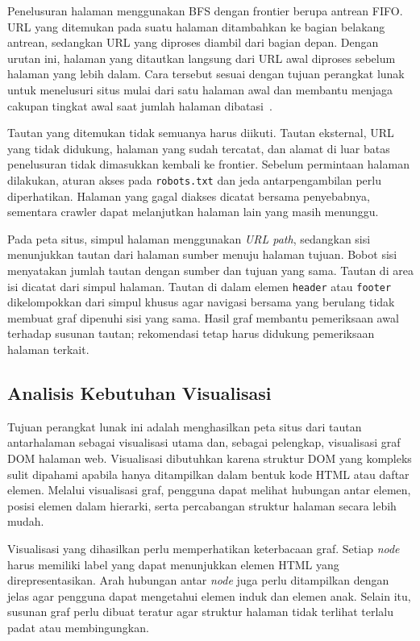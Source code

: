 Penelusuran halaman menggunakan BFS dengan frontier berupa antrean FIFO. URL yang ditemukan pada suatu halaman ditambahkan ke bagian belakang antrean, sedangkan URL yang diproses diambil dari bagian depan. Dengan urutan ini, halaman yang ditautkan langsung dari URL awal diproses sebelum halaman yang lebih dalam. Cara tersebut sesuai dengan tujuan perangkat lunak untuk menelusuri situs mulai dari satu halaman awal dan membantu menjaga cakupan tingkat awal saat jumlah halaman dibatasi~\cite{cormen:22:introalgo}.

Tautan yang ditemukan tidak semuanya harus diikuti. Tautan eksternal, URL yang tidak didukung, halaman yang sudah tercatat, dan alamat di luar batas penelusuran tidak dimasukkan kembali ke frontier. Sebelum permintaan halaman dilakukan, aturan akses pada \texttt{robots.txt} dan jeda antarpengambilan perlu diperhatikan. Halaman yang gagal diakses dicatat bersama penyebabnya, sementara crawler dapat melanjutkan halaman lain yang masih menunggu.

Pada peta situs, simpul halaman menggunakan \textit{URL path}, sedangkan sisi menunjukkan tautan dari halaman sumber menuju halaman tujuan. Bobot sisi menyatakan jumlah tautan dengan sumber dan tujuan yang sama. Tautan di area isi dicatat dari simpul halaman. Tautan di dalam elemen \texttt{header} atau \texttt{footer} dikelompokkan dari simpul khusus agar navigasi bersama yang berulang tidak membuat graf dipenuhi sisi yang sama. Hasil graf membantu pemeriksaan awal terhadap susunan tautan; rekomendasi tetap harus didukung pemeriksaan halaman terkait.

\subsection{Analisis Kebutuhan Visualisasi}
Tujuan perangkat lunak ini adalah menghasilkan peta situs dari tautan antarhalaman sebagai visualisasi utama dan, sebagai pelengkap, visualisasi graf DOM halaman web. Visualisasi dibutuhkan karena struktur DOM yang kompleks sulit dipahami apabila hanya ditampilkan dalam bentuk kode HTML atau daftar elemen. Melalui visualisasi graf, pengguna dapat melihat hubungan antar elemen, posisi elemen dalam hierarki, serta percabangan struktur halaman secara lebih mudah.

Visualisasi yang dihasilkan perlu memperhatikan keterbacaan graf. Setiap \textit{node} harus memiliki label yang dapat menunjukkan elemen HTML yang direpresentasikan. Arah hubungan antar \textit{node} juga perlu ditampilkan dengan jelas agar pengguna dapat mengetahui elemen induk dan elemen anak. Selain itu, susunan graf perlu dibuat teratur agar struktur halaman tidak terlihat terlalu padat atau membingungkan.

